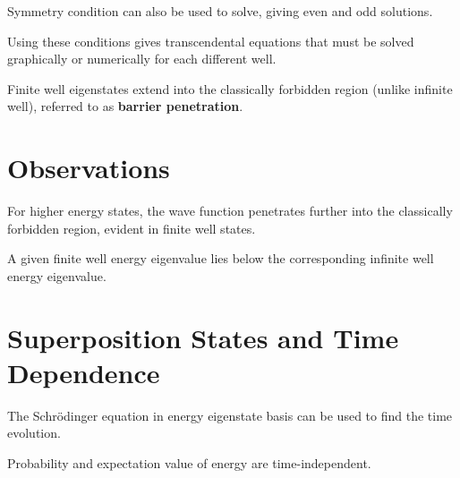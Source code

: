 \documentclass[11pt]{article}
\begin{document}
Symmetry condition can also be used to solve, giving even and odd solutions.

Using these conditions gives transcendental equations that must be solved graphically or numerically
for each different well.

Finite well eigenstates extend into the classically forbidden region (unlike infinite well),
referred to as \textbf{barrier penetration}.
\section{Observations}
\label{sec:org6e667e5}
For higher energy states, the wave function penetrates further into the classically forbidden region,
evident in finite well states.

A given finite well energy eigenvalue lies below the corresponding infinite well energy eigenvalue.
\section{Superposition States and Time Dependence}
\label{sec:orgfa3fb86}
The Schrödinger equation in energy eigenstate basis can be used to find the time evolution.

Probability and expectation value of energy are time-independent.
\end{document}
